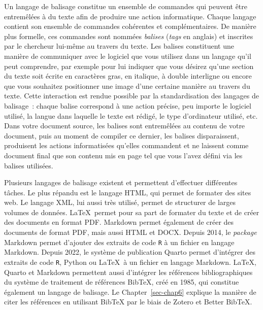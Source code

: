 \documentclass[
  letterpaper,
]{scrbook}
\begin{document}
Un langage de balisage constitue un ensemble de commandes qui peuvent
être entremêlées à du texte afin de produire une action informatique.
Chaque langage contient son ensemble de commandes cohérentes et
complémentaires. De manière plus formelle, ces commandes sont nommées
\emph{balises} (\emph{tags} en anglais) et inscrites par le chercheur
lui-même au travers du texte. Les balises constituent une manière de
communiquer avec le logiciel que vous utilisez dans un langage qu'il
peut comprendre, par exemple pour lui indiquer que vous désirez qu'une
section du texte soit écrite en caractères gras, en italique, à double
interligne ou encore que vous souhaitez positionner une image d'une
certaine manière au travers du texte. Cette interaction est rendue
possible par la standardisation des langages de balisage~: chaque balise
correspond à une action précise, peu importe le logiciel utilisé, la
langue dans laquelle le texte est rédigé, le type d'ordinateur utilisé,
etc. Dans votre document source, les balises sont entremêlées au contenu
de votre document, puis au moment de compiler ce dernier, les balises
disparaissent, produisent les actions informatisées qu'elles commandent
et ne laissent comme document final que son contenu mis en page tel que
vous l'avez défini via les balises utilisées.

Plusieurs langages de balisage existent et permettent d'effectuer
différentes tâches. Le plus répandu est le langage HTML, qui permet de
formater des sites web. Le langage XML, lui aussi très utilisé, permet
de structurer de larges volumes de données. \LaTeX~permet pour sa part
de formater du texte et de créer des documents en format PDF. Markdown
permet également de créer des documents de format PDF, mais aussi HTML
et DOCX. Depuis 2014, le \emph{package} \R Markdown permet d'ajouter des
extraits de code \texttt{R} à un fichier en langage Markdown. Depuis
2022, le système de publication Quarto permet d'intégrer des extraits de
code \texttt{R}, Python ou \LaTeX~à un fichier en langage Markdown.
\LaTeX, Quarto et Markdown permettent aussi d'intégrer les références
bibliographiques du système de traitement de références BibTeX, créé en
1985, qui constitue également un langage de balisage. Le
Chapter~\ref{sec-chap6} explique la manière de citer les références en
utilisant BibTeX par le biais de Zotero et Better BibTeX.
\end{document}

